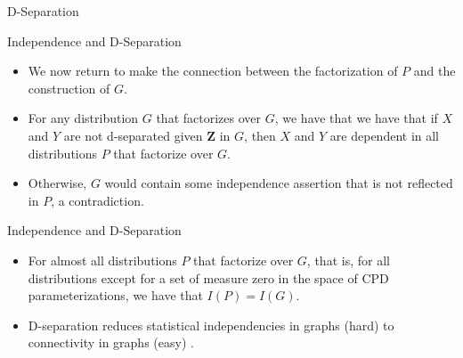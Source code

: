 \documentclass[11pt]{beamer}
\begin{document}
\begin{frame}{D-Separation \cite{pgmslides}}
\resizebox{\textwidth}{!}
{
}
\end{frame}

\begin{frame}{Independence and D-Separation}
\begin{itemize}
	\item We now return to make the connection between the factorization of
	$P$ and the construction of $G$.
	\item For any distribution $G$ that factorizes over $G$, we have that
	we have that if $X$ and $Y$ are not d-separated given $\boldsymbol{Z}$
	in $G$, then $X$ and $Y$ are dependent in all distributions $P$ that
	factorize over $G$.
	\item Otherwise, $G$ would contain some independence assertion that is
	not reflected in $P$, a contradiction.
\end{itemize}
\end{frame}

\begin{frame}{Independence and D-Separation}
\begin{itemize}
	\item For almost all distributions $P$ that factorize over $G$, that is,
	for all distributions except for a set of measure zero in the space of
	CPD parameterizations, we have that $I(P) = I(G)$.
	\item D-separation reduces statistical independencies in graphs (hard)
	to connectivity in graphs (easy) \cite{pgmslides}.
\end{itemize}
\end{frame}

\end{document}
